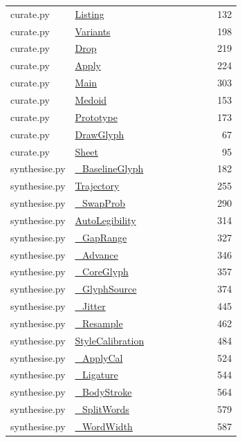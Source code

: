 \documentclass[11pt,a4paper,oneside]{report}
\begin{document}
\begin{longtable}{p{0.28\linewidth}p{0.48\linewidth}r}
curate.py & \hyperref[fn:curate:Listing]{Listing} & 132\\
curate.py & \hyperref[fn:curate:Variants]{Variants} & 198\\
curate.py & \hyperref[fn:curate:Drop]{Drop} & 219\\
curate.py & \hyperref[fn:curate:Apply]{Apply} & 224\\
curate.py & \hyperref[fn:curate:Main]{Main} & 303\\
curate.py & \hyperref[fn:curate:Medoid]{Medoid} & 153\\
curate.py & \hyperref[fn:curate:Prototype]{Prototype} & 173\\
curate.py & \hyperref[fn:curate:DrawGlyph]{DrawGlyph} & 67\\
curate.py & \hyperref[fn:curate:Sheet]{Sheet} & 95\\
synthesise.py & \hyperref[fn:synthesise:-BaselineGlyph]{\_BaselineGlyph} & 182\\
synthesise.py & \hyperref[fn:synthesise:Trajectory]{Trajectory} & 255\\
synthesise.py & \hyperref[fn:synthesise:-SwapProb]{\_SwapProb} & 290\\
synthesise.py & \hyperref[fn:synthesise:AutoLegibility]{AutoLegibility} & 314\\
synthesise.py & \hyperref[fn:synthesise:-GapRange]{\_GapRange} & 327\\
synthesise.py & \hyperref[fn:synthesise:-Advance]{\_Advance} & 346\\
synthesise.py & \hyperref[fn:synthesise:-CoreGlyph]{\_CoreGlyph} & 357\\
synthesise.py & \hyperref[fn:synthesise:-GlyphSource]{\_GlyphSource} & 374\\
synthesise.py & \hyperref[fn:synthesise:-Jitter]{\_Jitter} & 445\\
synthesise.py & \hyperref[fn:synthesise:-Resample]{\_Resample} & 462\\
synthesise.py & \hyperref[fn:synthesise:StyleCalibration]{StyleCalibration} & 484\\
synthesise.py & \hyperref[fn:synthesise:-ApplyCal]{\_ApplyCal} & 524\\
synthesise.py & \hyperref[fn:synthesise:-Ligature]{\_Ligature} & 544\\
synthesise.py & \hyperref[fn:synthesise:-BodyStroke]{\_BodyStroke} & 564\\
synthesise.py & \hyperref[fn:synthesise:-SplitWords]{\_SplitWords} & 579\\
synthesise.py & \hyperref[fn:synthesise:-WordWidth]{\_WordWidth} & 587\\

\end{longtable}
\end{document}
